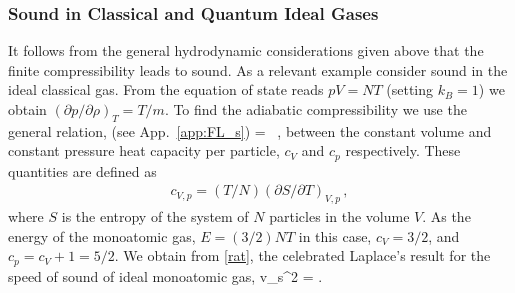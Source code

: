 \subsubsection{Sound in Classical and Quantum Ideal Gases}
It follows from the general hydrodynamic considerations given above that the finite compressibility leads to sound.
As a relevant  example  consider sound in the ideal classical gas.
From the equation of state reads $p V = N T$ (setting $k_B = 1$) we obtain $(\partial p/\partial \rho)_T = T/m$.
To find the adiabatic compressibility we use the general relation, (see App.~\ref{app:FL_s})
\be\label{rat}
 = \, ,
\ee
between the constant volume and constant pressure heat capacity per particle, $c_V$ and $c_p$ respectively.
These quantities are defined as
\begin{align}\label{c_Vp}
c_{V,p} = (T/N) (\partial S /\partial T)_{V,p}\, ,
\end{align}
where $S$ is the entropy of the system of $N$ particles in the volume $V$.
As the energy of the monoatomic gas, $E = (3/2) NT$ in this case, $c_V = 3/2$, and $c_p = c_V + 1 = 5/2$. 
We obtain from \eqref{rat}, the celebrated Laplace's result for the speed of sound of ideal monoatomic gas,
\be
v_s^2 = .
\ee 

